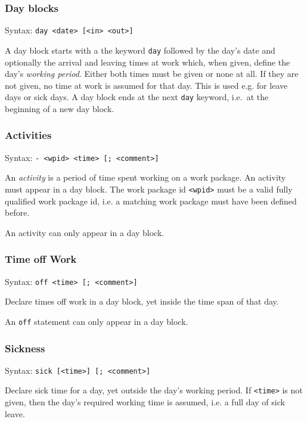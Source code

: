 \documentclass[11pt]{article}
\begin{document}
\subsubsection{Day blocks}

Syntax: \verb:day <date> [<in> <out>]:

A day block starts with a the keyword \verb:day: followed by the day's date and optionally the arrival and leaving times at work which, when given, define the day's \emph{working period}. Either both times must be given or none at all. If they are not given, no time at work is assumed for that day. This is used e.g. for leave days or sick days. A day block ends at the next \verb:day: keyword, i.e.\ at the beginning of a new day block.


\subsubsection{Activities}

Syntax: \verb:- <wpid> <time> [; <comment>]:

An \emph{activity} is a period of time spent working on a work package. An activity must appear in a day block. The work package id \verb:<wpid>: must be a valid fully qualified work package id, i.e. a matching work package must have been defined before.

An activity can only appear in a day block.

\subsubsection{Time off Work}

Syntax: \verb:off <time> [; <comment>]:

Declare times off work in a day block, yet inside the time span of that day.
 
An \verb:off: statement can only appear in a day block.

\subsubsection{Sickness}

Syntax: \verb:sick [<time>] [; <comment>]:

Declare sick time for a day, yet outside the day's working period.  If \verb:<time>: is not given, then the day's required working time is assumed, i.e. a full day of sick leave.
\end{document}

